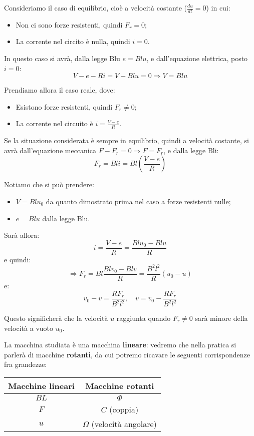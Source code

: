 \documentclass[a4paper,11pt]{article}
\begin{document}
Consideriamo il caso di equilibrio, cioè a velocità costante ($\frac{du}{dt} = 0$) in cui:
\begin{itemize}
	\item Non ci sono forze resistenti, quindi $F_r = 0$;
	\item La corrente nel circito è nulla, quindi $i = 0$.
\end{itemize}
In questo caso si avrà, dalla legge Blu $e = Blu$, e dall'equazione elettrica, posto $i=0$:
$$
V - e - Ri = V - Blu = 0 \Rightarrow V = Blu
$$

Prendiamo allora il caso reale, dove:
\begin{itemize}
	\item Esistono forze resistenti, quindi $F_r \neq 0$;
	\item La corrente nel circuito è $i = \frac{V - e}{R}$.
\end{itemize}
Se la situazione considerata è sempre in equilibrio, quindi a velocità costante, si avrà dall'equazione meccanica $F - F_r = 0 \Rightarrow F = F_r$, e dalla legge Bli:
$$
F_r = Bli = Bl \left( \frac{V - e}{R} \right)
$$

Notiamo che si può prendere:
\begin{itemize}
	\item $V = B l u_0$ da quanto dimostrato prima nel caso a forze resistenti nulle;
	\item $e = B l u$ dalla legge Blu.
\end{itemize}

Sarà allora:
$$
i = \frac{V - e}{R} = \frac{B l u_0 - B l u}{R}
$$
e quindi:
$$
\Rightarrow F_r = B l \frac{B l v_0 - Bl v}{R} = \frac{B^2l^2}{R}(u_0 - u)
$$
e:
$$
v_0 - v = \frac{R F_r}{B^2 l^2}, \quad v = v_0 - \frac{R F_r}{B^2 l^2}
$$

Questo significherà che la velocità $u$ raggiunta quando $F_r \neq 0$ sarà minore della velocità a vuoto $u_0$.

\par\smallskip

La macchina studiata è una macchina \textbf{lineare}: vedremo che nella pratica si parlerà di macchine \textbf{rotanti}, da cui potremo ricavare le seguenti corrispondenze fra grandezze:

\begin{table}[h!]
	\center {}
	\begin{tabular} { c | c }
		\bfseries Macchine lineari & \bfseries Macchine rotanti \\ 
		\hline
		$BL$ & $\Phi$ \\ 
		$F$ & $C$ (coppia) \\ 
		$u$ & $\Omega$ (velocità angolare) \\ 
	\end{tabular}
\end{table}
\end{document}
